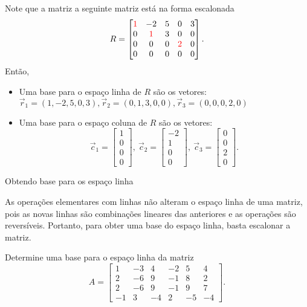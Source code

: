 \begin{frame}[label=lild]{}
Note que a matriz a seguinte matriz está na forma escalonada
\[
R=\begin{bmatrix}
{\color{red}1} & -2 & 5 & 0 & 3\\
0& {\color{red}1}& 3 & 0 & 0 \\
0& 0& 0 & {\color{red}2} & 0\\
0& 0& 0 & 0 & 0
\end{bmatrix}.
\]
Então, 
\begin{itemize}
\item Uma base para o espaço linha de $R$ são os vetores: $\vec{r}_1=(1, -2, 5, 0, 3), \vec{r}_2=(0,1,3,0, 0), \vec{r}_3=(0,0,0,2,0)$ 

\item Uma base para o espaço coluna de $R$ são os vetores:
\[
\vec{c}_1=\begin{bmatrix}
1 \\ 0 \\ 0\\ 0
\end{bmatrix},\
\vec{c}_2=\begin{bmatrix}
-2 \\ 1 \\ 0\\ 0
\end{bmatrix},\
\vec{c}_3=\begin{bmatrix}
0 \\ 0 \\ 2\\ 0
\end{bmatrix}.
\]

\end{itemize}

\end{frame}



\begin{frame}[label=lild]{Obtendo base para os espaço linha}


{\color{blue}As operações elementares com linhas não alteram o espaço linha de uma matriz}, pois as novas linhas são combinações lineares das anteriores e as operações são reversíveis. Portanto, para obter uma base do espaço linha, basta escalonar a matriz.  

\begin{exe}
Determine uma base para o espaço linha da matriz
\[
A=\begin{bmatrix}
1 & -3 & 4 & -2 & 5 & 4\\
2 & -6 & 9 & -1 & 8 & 2\\
2 & -6 & 9 & -1 & 9 & 7\\
-1 & 3& -4 & 2 & -5 & -4
\end{bmatrix}.
\]
\end{exe}
\end{frame}


